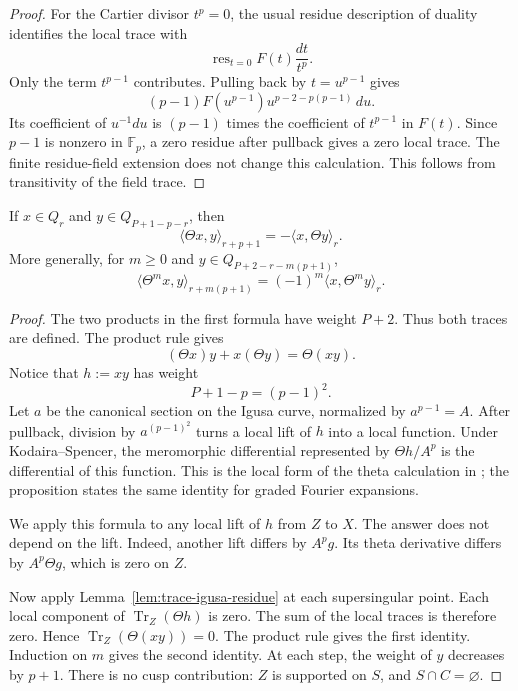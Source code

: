 \begin{proof}
For the Cartier divisor $t^p=0$, the usual residue description of
duality identifies the local trace with
\[
 \operatorname{res}_{t=0}F(t)\frac{dt}{t^p}.
\]
Only the term $t^{p-1}$ contributes.  Pulling back by $t=u^{p-1}$ gives
\[
 (p-1)F(u^{p-1})u^{p-2-p(p-1)}\,du.
\]
Its coefficient of $u^{-1}du$ is $(p-1)$ times the coefficient of
$t^{p-1}$ in $F(t)$.  Since $p-1$ is nonzero in $\mathbb F_p$, a zero
residue after pullback gives a zero local trace.  The finite residue-field
extension does not change this calculation.  This follows from transitivity
of the field trace.
\end{proof}

\begin{proposition}
\label{prop:theta-adjointness}
If $x\in Q_r$ and $y\in Q_{P+1-p-r}$, then
\[
 \langle\Theta x,y\rangle_{r+p+1}
   =-\langle x,\Theta y\rangle_r.
\]
More generally, for $m\geq0$ and
$y\in Q_{P+2-r-m(p+1)}$,
\[
 \langle\Theta^m x,y\rangle_{r+m(p+1)}
   =(-1)^m\langle x,\Theta^m y\rangle_r.
\]
\end{proposition}

\begin{proof}
The two products in the first formula have weight $P+2$.  Thus both traces
are defined.  The product rule gives
\[
 (\Theta x)y+x(\Theta y)=\Theta(xy).
\]
Notice that $h:=xy$ has weight
\[
 P+1-p=(p-1)^2.
\]
Let $a$ be the canonical section on the Igusa curve, normalized by
$a^{p-1}=A$.  After pullback, division by $a^{(p-1)^2}$ turns a local lift
of $h$ into a local function.  Under Kodaira--Spencer, the meromorphic
differential represented by $\Theta h/A^p$ is the differential of this
function.  This is the local form of the theta calculation in
\cite[Proposition~5.8]{Gross1990}; the proposition states the same identity
for graded Fourier expansions.

We apply this formula to any local lift of $h$ from $Z$ to $X$.  The answer
does not depend on the lift.  Indeed, another lift differs by $A^p g$.  Its
theta derivative differs by $A^p\Theta g$, which is zero on $Z$.

Now apply Lemma~\ref{lem:trace-igusa-residue} at each supersingular point.
Each local component of $\operatorname{Tr}_Z(\Theta h)$ is zero.  The sum of
the local traces is therefore zero.  Hence
$\operatorname{Tr}_Z(\Theta(xy))=0$.  The product rule gives the first
identity.  Induction on $m$ gives the second identity.  At each step, the
weight of $y$ decreases by $p+1$.
There is no cusp contribution: $Z$ is supported on $S$, and
$S\cap C=\varnothing$.
\end{proof}

